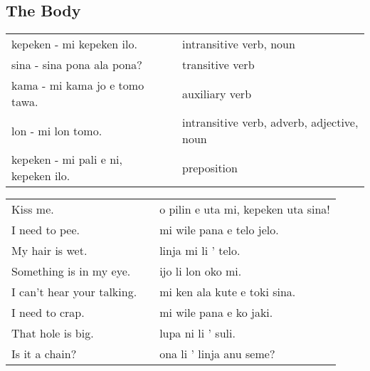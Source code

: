 \newpage
%
\subsection*{The Body}
\label{'the_body'}
%

\begin{supertabular}{p{5,5cm}|ll}
    kepeken - mi kepeken ilo.            &  & intransitive verb, noun                    \\ %
    sina - sina pona ala pona?           &  & transitive verb                            \\ %
    kama - mi kama jo e tomo tawa.       &  & auxiliary verb                             \\ %
    lon - mi lon tomo.                   &  & intransitive verb, adverb, adjective, noun \\ %
    kepeken - mi pali e ni, kepeken ilo. &  & preposition                                \\ %
\end{supertabular}

\begin{supertabular}{p{5,5cm}|ll}
    Kiss me.                   &  & o pilin e uta mi, kepeken uta sina! \\ %
    I need to pee.             &  & mi wile pana e telo jelo.           \\ %
    My hair is wet.            &  & linja mi li ' telo.                 \\ %
    Something is in my eye.    &  & ijo li lon oko mi.                  \\ %
    I can't hear your talking. &  & mi ken ala kute e toki sina.        \\ %
    I need to crap.            &  & mi wile pana e ko jaki.             \\ %
    That hole is big.          &  & lupa ni li ' suli.                  \\ %
    Is it a chain?             &  & ona li ' linja anu seme?            \\ %
\end{supertabular}

